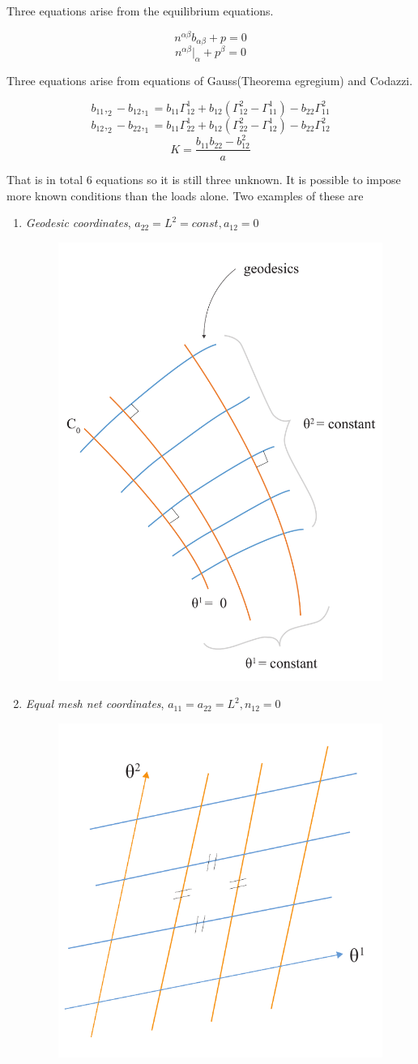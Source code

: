 Three equations arise from the equilibrium equations.

$$n^{\alpha \beta}b_{\alpha \beta} + p = 0$$
$$n^{\alpha \beta}|_\alpha + p^\beta = 0$$

Three equations arise from equations of Gauss(Theorema egregium) and Codazzi.


$$ b_{11},_2 - b_{12},_1 = b_{11} \Gamma^1_{12} + b_{12}(\Gamma^2_{12} - \Gamma^1_{11}) - b_{22}\Gamma^2_{11} $$
$$   b_{12},_2 - b_{22},_1 = b_{11} \Gamma^1_{22} + b_{12}(\Gamma^2_{22} - \Gamma^1_{12}) - b_{22}\Gamma^2_{12} $$
$$  K= \frac{b_{11}b_{22}-b^2_{12}}{a}$$

That is in total 6 equations so it is still three unknown. It is possible to impose more known conditions than the loads alone. Two examples of these are
\vspace{5mm}
\begin{enumerate}
\item \textit{Geodesic coordinates}, $a_{22} = L^2 = const, a_{12}=0$
\begin{figure}[H]
\centering
\includegraphics[height=0.7\linewidth ]{figure/Theory/geodesicCoordRe.pdf}
\end{figure}
\item \textit{Equal mesh net coordinates}, $a_{11}= a_{22} = L^2, n_{12}=0$ 
\begin{figure}[H]
\centering
\includegraphics[height=0.4\linewidth ]{figure/Theory/equalMeshFrei.pdf}
\end{figure}
\end{enumerate}


